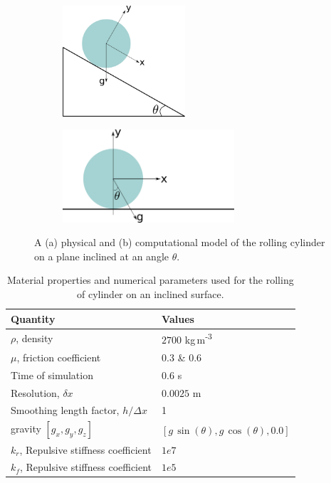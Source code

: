 \begin{figure}[!htpb]
  \centering
  \begin{subfigure}{0.48\textwidth}
    \centering
    \includegraphics[width=0.5\textwidth]{images/rfc/images/de_2021_cylinder_rolling_on_an_inclined_plane/schematic_1}
    \subcaption{}\label{fig:circular-body:schematic-1}
  \end{subfigure}
  \begin{subfigure}{0.48\textwidth}
    \centering
    \includegraphics[width=0.7\textwidth]{images/rfc/images/de_2021_cylinder_rolling_on_an_inclined_plane/schematic_2}
    \subcaption{}\label{fig:circular-body:schematic-2}
  \end{subfigure}
  \caption{A (a) physical and (b) computational model of the rolling cylinder on a
    plane inclined at an angle $\theta$.}
\label{fig:circular-body-schematic}
\end{figure}
\begin{table}[!ht]
  \centering
  \begin{tabular}[!ht]{ll}
    \toprule
    Quantity & Values\\
    \midrule
    $\rho$, density & $2700$ kg\,m\textsuperscript{-3} \\
    $\mu$, friction coefficient & $0.3$ \& $0.6$ \\
    Time of simulation & $0.6$ s \\
    Resolution, $\delta x$ & $0.0025$ m\\
    Smoothing length factor, $h/\Delta x$ & 1\\
    gravity $[g_x, g_y, g_z]$ & $[g\,\sin(\theta), g\,\cos(\theta), 0.0]$\\
    $k_r$, Repulsive stiffness coefficient & $1e7$ \\
    $k_f$, Repulsive stiffness coefficient & $1e5$
    \bottomrule
  \end{tabular}
  \caption{Material properties and numerical parameters used for the rolling
    of cylinder on an inclined surface.}%
  \label{tab:circular-body-rolling-params}
\end{table}

